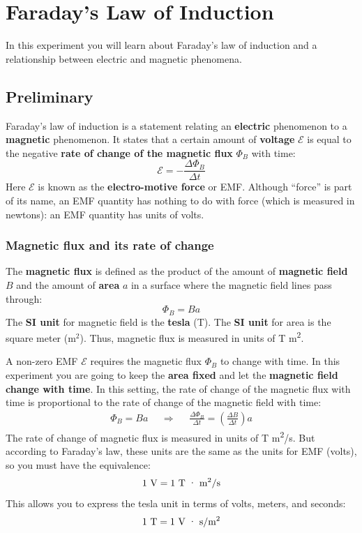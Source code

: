\setcounter{chapter}{3}
\chapter{Faraday's Law of Induction}
%
In this experiment you will learn about Faraday's law of induction and a relationship between electric and magnetic phenomena.
%
\section{Preliminary}
%
Faraday's law of induction is a statement relating an \textbf{electric} phenomenon to a \textbf{magnetic} phenomenon. It states that a certain amount of \textbf{voltage} $\mathcal{E}$ is equal to the negative \textbf{rate of change of the magnetic flux} $\Phi_{B}$ with time:
\begin{equation}
	\mathcal{E} = -\frac{\Delta \Phi_{B}}{\Delta t}
	\label{eq.04.faradays.law}
\end{equation}
Here $\mathcal{E}$ is known as the \textbf{electro-motive force} or EMF. Although ``force'' is part of its name, an EMF quantity has nothing to do with force (which is measured in newtons): an EMF quantity has units of volts.
%
\subsection{Magnetic flux and its rate of change}
%
The \textbf{magnetic flux} is defined as the product of the amount of \textbf{magnetic field} $B$ and the amount of \textbf{area} $a$ in a surface where the magnetic field lines pass through:
\begin{equation}
	\Phi_{B} = B a
\end{equation}
The \textbf{SI unit} for magnetic field is the \textbf{tesla} (T). The \textbf{SI unit} for area is the square meter (m$^{2}$). Thus, magnetic flux is measured in units of T {\textperiodcentered} m\textsuperscript{2}.

A non-zero EMF $\mathcal{E}$ requires the magnetic flux $\Phi_{B}$ to change with time. In this experiment you are going to keep the \textbf{area fixed} and let the \textbf{magnetic field change with time}. In this setting, the rate of change of the magnetic flux with time is proportional to the rate of change of the magnetic field with time:
\begin{align}
	\Phi_{B} = B a && \Longrightarrow && \frac{\Delta \Phi_{B}}{\Delta t} = \left(\frac{\Delta B}{\Delta t}\right) a
	\label{eq.04.flux.rate}
\end{align}
The rate of change of magnetic flux is measured in units of T {\textperiodcentered} m\textsuperscript{2}/s. But according to Faraday's law, these units are the same as the units for EMF (volts), so you must have the equivalence:
\begin{equation}
	1 \ \text{V} = 1 \ \text{T {\textperiodcentered} m\textsuperscript{2}/s}
\end{equation}
This allows you to express the tesla unit in terms of volts, meters, and seconds:
\begin{equation}
	1 \ \text{T} = 1 \ \text{V {\textperiodcentered} s/m\textsuperscript{2}}
\end{equation}
%
